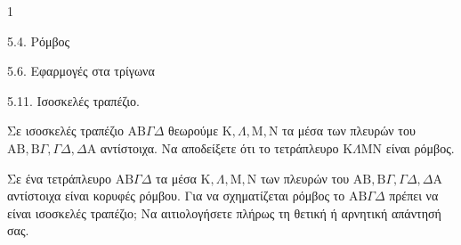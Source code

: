 \begin{ylh}{1}
    \item 5.4. Ρόμβος
    \item 5.6. Εφαρμογές στα τρίγωνα
    \item 5.11. Ισοσκελές τραπέζιο.
\end{ylh}
\begin{alist}
    \item Σε ισοσκελές τραπέζιο $\mathrm{A}\mathrm{B}\Gamma\Delta$ θεωρούμε $\mathrm{K}, \Lambda, \mathrm{M}, \mathrm{N}$ τα μέσα των πλευρών του $\mathrm{A}\mathrm{B}, \mathrm{B}\Gamma, \Gamma\Delta, \Delta\mathrm{A}$ αντίστοιχα. Να αποδείξετε ότι το τετράπλευρο $\mathrm{K}\Lambda\mathrm{M}\mathrm{N}$ είναι ρόμβος. 
    \item Σε ένα τετράπλευρο $\mathrm{A}\mathrm{B}\Gamma\Delta$ τα μέσα $\mathrm{K}, \Lambda, \mathrm{M}, \mathrm{N}$ των πλευρών του $\mathrm{A}\mathrm{B}, \mathrm{B}\Gamma, \Gamma\Delta, \Delta\mathrm{A}$ αντίστοιχα είναι κορυφές ρόμβου. Για να σχηματίζεται ρόμβος το $\mathrm{A}\mathrm{B}\Gamma\Delta$ πρέπει να είναι ισοσκελές τραπέζιο; Να αιτιολογήσετε πλήρως τη θετική ή αρνητική απάντησή σας. 
\end{alist}
